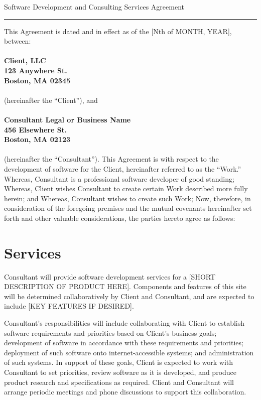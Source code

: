 \documentclass[10pt]{article}
\begin{document}
\begin{center}
{\Large Software Development and Consulting Services Agreement}
\end{center}

\hrule height .1mm

\vspace{.5cm}

\noindent This Agreement is dated and in effect as of the [Nth of MONTH, YEAR], between:\\
\\
{\bf Client, LLC\\
123 Anywhere St.\\
Boston, MA 02345\\}
\\
(hereinafter the ``Client''), and\\
\\
{\bf Consultant Legal or Business Name\\
456 Elsewhere St.\\
Boston, MA 02123\\}
\\
(hereinafter the ``Consultant'').  This Agreement is with respect to the
development of software for the Client, hereinafter referred to as the
``Work.''   Whereas, Consultant is a professional software developer of good
standing; Whereas, Client wishes Consultant to create certain Work described
more fully herein; and Whereas, Consultant wishes to create such Work; Now,
therefore, in consideration of the foregoing premises and the mutual
covenants hereinafter set forth and other valuable considerations, the
parties hereto agree as follows: 


\section{Services}

Consultant will provide software development services for a [SHORT
  DESCRIPTION OF PRODUCT HERE].  Components and features of this site will
be determined collaboratively by Client and Consultant, and are expected to
include [KEY FEATURES IF DESIRED].

Consultant's responsibilities will include collaborating with Client to
establish software requirements and priorities based on Client's business
goals; development of software in accordance with these requirements and
priorities; deployment of such software onto internet-accessible systems;
and administration of such systems.  In support of these goals, Client is
expected to work with Consultant to set priorities, review software as it is
developed, and produce product research and specifications as required.
Client and Consultant will arrange periodic meetings and phone discussions
to support this collaboration.
\end{document}
